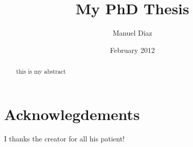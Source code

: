 \documentclass[a4paper]{report}
\begin{document}
\title{My PhD Thesis}
\author{Manuel Diaz}
\date{February 2012}

\maketitle

\tableofcontents

\chapter*{Acknowlegdements}
I thanks the creator for all his patient!

\begin{abstract}
this is my abstract
\end{abstract}








\end{document}
